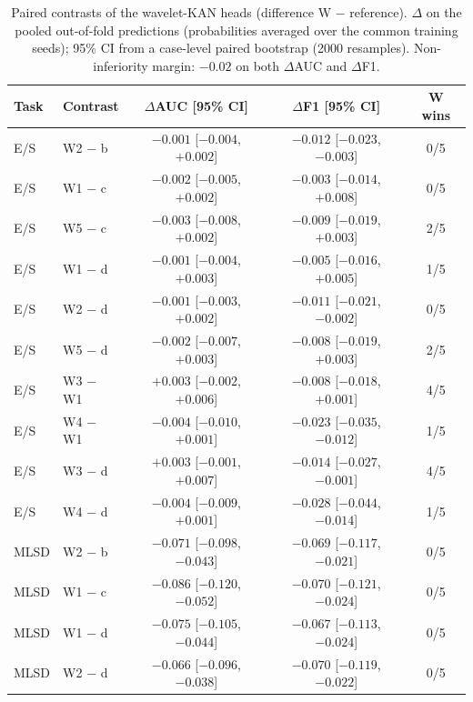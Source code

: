 \begin{table}[t]
\centering
\caption{Paired contrasts of the wavelet-KAN heads (difference W $-$ reference). $\Delta$ on the pooled out-of-fold predictions (probabilities averaged over the common training seeds); 95\% CI from a case-level paired bootstrap (2000 resamples). Non-inferiority margin: $-0.02$ on both $\Delta$AUC and $\Delta$F1.}
\label{tab:wavkan_contrastes}
\scriptsize
\setlength{\tabcolsep}{3pt}
\begin{tabular}{llccc}
\hline
Task & Contrast & $\Delta$AUC [95\% CI] & $\Delta$F1 [95\% CI] & W wins \\
\hline
E/S & W2 $-$ b & $-0.001$ [$-0.004$, $+0.002$] & $-0.012$ [$-0.023$, $-0.003$] & 0/5 \\
E/S & W1 $-$ c & $-0.002$ [$-0.005$, $+0.002$] & $-0.003$ [$-0.014$, $+0.008$] & 0/5 \\
E/S & W5 $-$ c & $-0.003$ [$-0.008$, $+0.002$] & $-0.009$ [$-0.019$, $+0.003$] & 2/5 \\
E/S & W1 $-$ d & $-0.001$ [$-0.004$, $+0.003$] & $-0.005$ [$-0.016$, $+0.005$] & 1/5 \\
E/S & W2 $-$ d & $-0.001$ [$-0.003$, $+0.002$] & $-0.011$ [$-0.021$, $-0.002$] & 0/5 \\
E/S & W5 $-$ d & $-0.002$ [$-0.007$, $+0.003$] & $-0.008$ [$-0.019$, $+0.003$] & 2/5 \\
E/S & W3 $-$ W1 & $+0.003$ [$-0.002$, $+0.006$] & $-0.008$ [$-0.018$, $+0.001$] & 4/5 \\
E/S & W4 $-$ W1 & $-0.004$ [$-0.010$, $+0.001$] & $-0.023$ [$-0.035$, $-0.012$] & 1/5 \\
E/S & W3 $-$ d & $+0.003$ [$-0.001$, $+0.007$] & $-0.014$ [$-0.027$, $-0.001$] & 4/5 \\
E/S & W4 $-$ d & $-0.004$ [$-0.009$, $+0.001$] & $-0.028$ [$-0.044$, $-0.014$] & 1/5 \\
MLSD & W2 $-$ b & $-0.071$ [$-0.098$, $-0.043$] & $-0.069$ [$-0.117$, $-0.021$] & 0/5 \\
MLSD & W1 $-$ c & $-0.086$ [$-0.120$, $-0.052$] & $-0.070$ [$-0.121$, $-0.024$] & 0/5 \\
MLSD & W1 $-$ d & $-0.075$ [$-0.105$, $-0.044$] & $-0.067$ [$-0.113$, $-0.024$] & 0/5 \\
MLSD & W2 $-$ d & $-0.066$ [$-0.096$, $-0.038$] & $-0.070$ [$-0.119$, $-0.022$] & 0/5 \\
\hline
\end{tabular}
\end{table}
